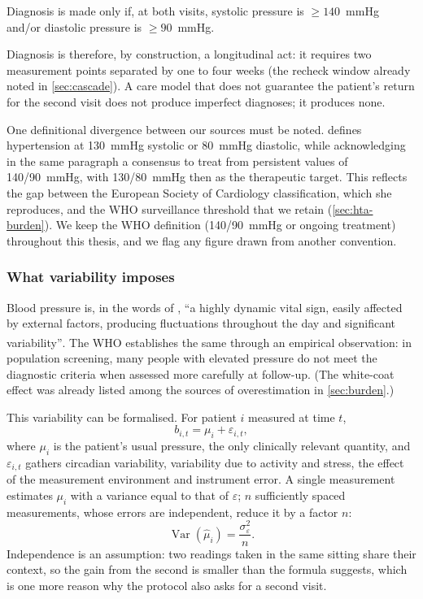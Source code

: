 \documentclass[12pt,a4paper,oneside]{report}
\newcommand{\bq}[1]{``#1''\textsuperscript{\dag}}
\begin{document}
Diagnosis is made only if, at both visits, systolic pressure is $\geq 140$~mmHg and/or diastolic pressure is $\geq 90$~mmHg.

Diagnosis is therefore, by construction, a longitudinal act: it requires two measurement points separated by one to four weeks (the recheck window already noted in \cref{sec:cascade}). A care model that does not guarantee the patient's return for the second visit does not produce imperfect diagnoses; it produces none.

One definitional divergence between our sources must be noted. \textcite{navarro2023} defines hypertension at 130~mmHg systolic or 80~mmHg diastolic, while acknowledging in the same paragraph a consensus to treat from persistent values of 140/90~mmHg, with 130/80~mmHg then as the therapeutic target. This reflects the gap between the European Society of Cardiology classification, which she reproduces, and the WHO surveillance threshold that we retain (\cref{sec:hta-burden}). We keep the WHO definition (140/90~mmHg or ongoing treatment) throughout this thesis, and we flag any figure drawn from another convention.

\subsubsection{What variability imposes}\label{sec:variability}

Blood pressure is, in the words of \textcite{navarro2023}, \bq{a highly dynamic vital sign, easily affected by external factors, producing fluctuations throughout the day and significant variability}. The WHO establishes the same through an empirical observation: in population screening, many people with elevated pressure do not meet the diagnostic criteria when assessed more carefully at follow-up. (The white-coat effect was already listed among the sources of overestimation in \cref{sec:burden}.)

This variability can be formalised. For patient $i$ measured at time $t$,
\begin{equation}
  b_{i,t} = \mu_i + \varepsilon_{i,t},
\end{equation}
where $\mu_i$ is the patient's usual pressure, the only clinically relevant quantity, and $\varepsilon_{i,t}$ gathers circadian variability, variability due to activity and stress, the effect of the measurement environment and instrument error. A single measurement estimates $\mu_i$ with a variance equal to that of $\varepsilon$; $n$ sufficiently spaced measurements, whose errors are independent, reduce it by a factor $n$:
\begin{equation}
  \operatorname{Var}(\hat\mu_i) = \frac{\sigma_\varepsilon^2}{n}.
\end{equation}
Independence is an assumption: two readings taken in the same sitting share their context, so the gain from the second is smaller than the formula suggests, which is one more reason why the protocol also asks for a second visit.
\end{document}
